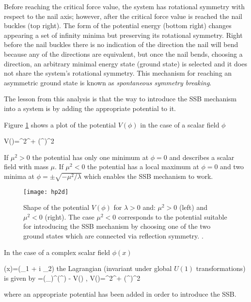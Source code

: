Before reaching the critical force value, the system has rotational symmetry with respect to the nail axis; however, after the critical force value is reached the nail buckles (top right). The form of the potential energy (bottom right) changes appearing a set of infinity minima  but preserving its rotational symmetry. Right before the nail buckles there is no indication of the direction the nail will bend because any of the directions are equivalent, but once the nail bends, choosing a direction, an arbitrary minimal energy state (ground state) is selected and it does not share the system's rotational symmetry. This mechanism for reaching an asymmetric ground state is known as \textit{spontaneous symmetry breaking}.       

The lesson from this analysis is that the way to introduce the SSB mechanism into a system is by adding the appropriate potential to it.

Figure \ref{hp2d} shows a plot of the potential $V(\phi)$ in the case of a scalar field $\phi$

\beqn\label{Higgs_potential}
V(\phi)=\mu^2\phi^\dagger\phi + \lambda(\phi^\dagger\phi)^2
\eeqn

If $\mu^2>0$ the potential has only one minimum at $\phi=0$ and describes a scalar field with mass $\mu$. If $\mu^2<0$ the potential has a local maximum at $\phi=0$ and two minima at $\phi=\pm \sqrt{-\mu^2/\lambda}$ which enables the SSB mechanism to work.

\begin{figure}[!h]
\centering
\texttt{[image: hp2d]}
\caption[SSB Potential form]{Shape of the potential $V(\phi)$ for $\lambda>0$ and: $\mu^2>0$ (left) and $\mu^2<0$ (right). The case $\mu^2<0$ corresponds to the potential suitable for introducing the SSB mechanism by choosing one of the two ground states which are connected via reflection symmetry. \cite{broken_symmetry}.}
\label{hp2d}
\end{figure}

In the case of a complex scalar field $\phi(x)$

\beqn\label{complex_scalar}
\phi(x)=(\phi_1 + i \phi_2)
\eeqn
\noindent the Lagrangian (invariant under global $U(1)$ transformations) is given by 
\beqn\label{higgs_potential}
\Lagr=(\partial_\mu\phi)^\dagger(\partial^\mu\phi) - V(\phi) , \qquad V(\phi)=\mu^2\phi^\dagger\phi + \lambda(\phi^\dagger\phi)^2
\eeqn

\noindent where an appropriate potential has been added in order to introduce the SSB.


